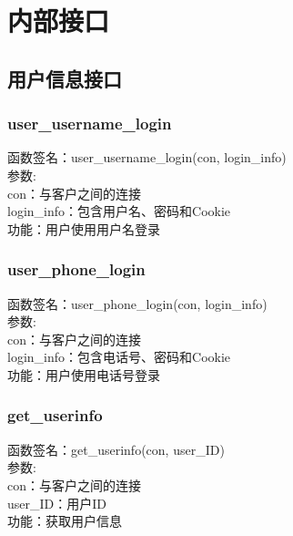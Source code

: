 
\section{内部接口}

\subsection{用户信息接口}

\subsubsection{user\_username\_login}
\noindent
函数签名：user\_username\_login(con, login\_info)\\
参数:\\
con：与客户之间的连接\\
login\_info：包含用户名、密码和Cookie\\
功能：用户使用用户名登录

\subsubsection{user\_phone\_login}
\noindent
函数签名：user\_phone\_login(con, login\_info)\\
参数:\\
con：与客户之间的连接\\
login\_info：包含电话号、密码和Cookie\\
功能：用户使用电话号登录

\subsubsection{get\_userinfo}
\noindent
函数签名：get\_userinfo(con, user\_ID)\\
参数:\\
con：与客户之间的连接\\
user\_ID：用户ID\\
功能：获取用户信息


